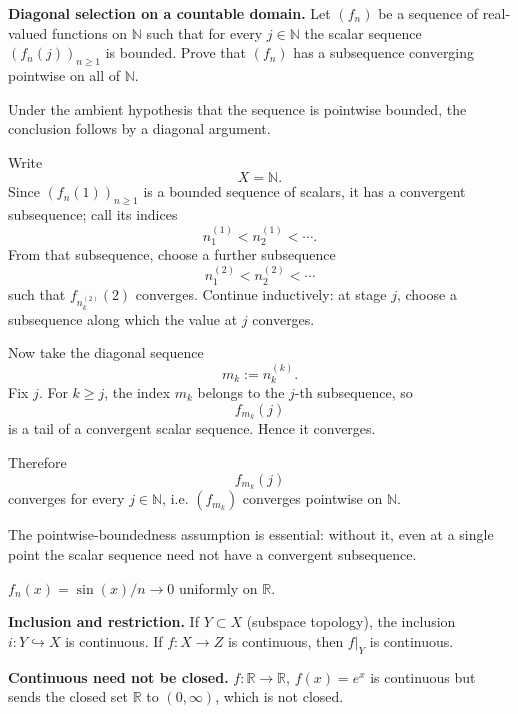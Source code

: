 \begin{problem}[CP-IV-0041]
\label{prob:cp-iv-0041}
\par\noindent\textbf{Diagonal selection on a countable domain.}\quad
Let $(f_n)$ be a sequence of real-valued functions on $\mathbb N$
such that for every $j\in\mathbb N$ the scalar sequence $(f_n(j))_{n\ge1}$
is bounded. Prove that $(f_n)$ has a subsequence converging pointwise
on all of $\mathbb N$.
\end{problem}

\begin{solution}
Under the ambient hypothesis that the sequence is pointwise bounded, the conclusion follows by a diagonal argument.

Write
\[
X=\mathbb N.
\]
Since \((f_n(1))_{n\ge1}\) is a bounded sequence of scalars, it has a convergent subsequence; call its indices
\[
n^{(1)}_1<n^{(1)}_2<\cdots.
\]
From that subsequence, choose a further subsequence
\[
n^{(2)}_1<n^{(2)}_2<\cdots
\]
such that \(f_{n^{(2)}_k}(2)\) converges. Continue inductively: at stage \(j\), choose a subsequence along which the value at \(j\) converges.

Now take the diagonal sequence
\[
m_k:=n^{(k)}_k.
\]
Fix \(j\). For \(k\ge j\), the index \(m_k\) belongs to the \(j\)-th subsequence, so
\[
f_{m_k}(j)
\]
is a tail of a convergent scalar sequence. Hence it converges.

Therefore
\[
f_{m_k}(j)
\]
converges for every \(j\in\mathbb N\), i.e. \((f_{m_k})\) converges pointwise on \(\mathbb N\).

The pointwise-boundedness assumption is essential: without it, even at a single point the scalar sequence need not have a convergent subsequence.
\end{solution}


\begin{problem}[CP-IV-0042]
\label{prob:cp-iv-0042}
$f_n(x)=\sin(x)/n\to 0$ uniformly on $\mathbb{R}$.

	\par\noindent\textbullet\quad \textbf{Inclusion and restriction.}
	If $Y\subset X$ (subspace topology), the inclusion $i:Y\hookrightarrow X$ is continuous.
	If $f:X\to Z$ is continuous, then $f|_Y$ is continuous.

	\par\noindent\textbullet\quad \textbf{Continuous need not be closed.}
	$f:\mathbb{R}\to\mathbb{R}$, $f(x)=e^x$ is continuous but sends the closed set $\mathbb{R}$ to $(0,\infty)$, which is not closed.
\end{problem}

